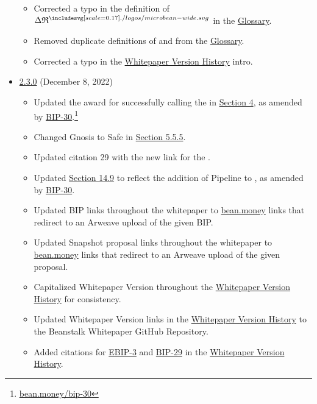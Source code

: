 \documentclass[class=article, crop=false]{standalone}
\begin{document}
\begin{itemize}[topsep=0pt, itemsep=3pt,leftmargin=16pt]
\begin{itemize}
        \item Corrected a typo in the definition of $\Delta \mathfrak{R}^{\bean}$ in the \hyperlink{subsection.14.11}{Glossary}.
        \item Removed duplicate definitions of  and  from the \hyperlink{subsection.14.11}{Glossary}.
        \item Corrected a typo in the \hyperlink{subsection.14.12}{Whitepaper Version History} intro.
    \end{itemize}  
            \item \href{https://github.com/BeanstalkFarms/Beanstalk-Whitepaper/blob/master/version-history/beanstalk2_3_0.pdf}{2.3.0} (December 8, 2022)
    \begin{itemize}
        \item Updated the award for successfully calling the  in \hyperlink{section.4}{Section 4}, as amended by \href{https://bean.money/bip-30}{BIP-30}.\footnote{\href{https://bean.money/bip-30}{bean.money/bip-30}}
        \item Changed Gnosis to Safe in \hyperlink{subsubsection.5.5.5}{Section 5.5.5}.
        \item Updated citation 29 with the new link for the .
        \item Updated \hyperlink{subsection.14.9}{Section 14.9} to reflect the addition of Pipeline  to , as amended by \href{https://bean.money/bip-30}{BIP-30}.
        \item Updated BIP links throughout the whitepaper to \href{https://bean.money}{bean.money} links that redirect to an Arweave upload of the given BIP.
        \item Updated Snapshot proposal links throughout the whitepaper to \href{https://bean.money}{bean.money} links that redirect to an Arweave upload of the given proposal.
        \item Capitalized Whitepaper Version throughout the \hyperlink{subsection.14.12}{Whitepaper Version History} for consistency.
        \item Updated Whitepaper Version links in the \hyperlink{subsection.14.12}{Whitepaper Version History} to the Beanstalk Whitepaper GitHub Repository.
        \item Added citations for \href{https://bean.money/ebip-3}{EBIP-3} and \href{https://bean.money/bip-29}{BIP-29} in the \hyperlink{subsection.14.12}{Whitepaper Version History}.

\end{itemize}
\end{itemize}
\end{document}
